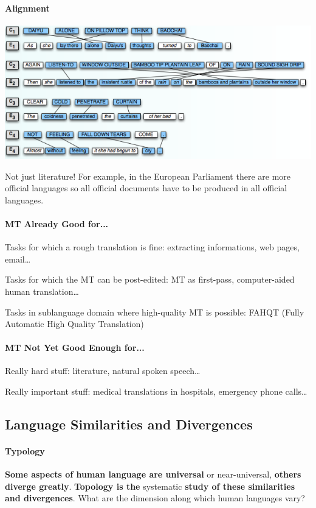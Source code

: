 \documentclass[10pt]{report}
\begin{document}
\paragraph{Alignment}
\begin{center}
	\includegraphics[scale=0.5]{61.png}
\end{center}
Not just literature! For example, in the European Parliament there are more official languages so all official documents have to be produced in all official languages.
\paragraph{MT Already Good for...}\begin{list}{}{}
	\item Tasks for which a rough translation is fine: extracting informations, web pages, email\ldots
	\item Tasks for which the MT can be post-edited: MT as first-pass, computer-aided human translation\ldots
	\item Tasks in sublanguage domain where high-quality MT is possible: FAHQT (Fully Automatic High Quality Translation)
\end{list}
\paragraph{MT Not Yet Good Enough for...}\begin{list}{}{}
	\item Really hard stuff: literature, natural spoken speech\ldots
	\item Really important stuff: medical translations in hospitals, emergency phone calls\ldots
\end{list}
\subsection{Language Similarities and Divergences}
\paragraph{Typology} \textbf{Some aspects of human language are universal} or near-universal, \textbf{others diverge greatly}. \textbf{Topology is the} systematic \textbf{study of these similarities and divergences}. What are the dimension along which human languages vary?
\end{document}

